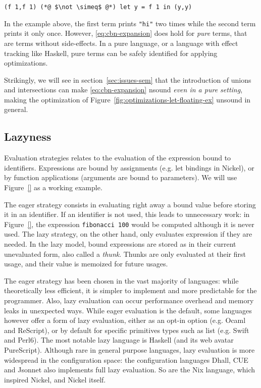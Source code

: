 \documentclass[sigplan,10pt,review,anonymous]{acmart}
\newcommand{\unsure}[2][1=]{}
\newcommand{\resolved}[2]{}
\newcommand{\nickel}[1]{\lstinline[language=nickel]{#1}}
\begin{document}
\begin{lstlisting}[language=Nickel]
(f 1,f 1) (*@ $\not \simeq$ @*) let y = f 1 in (y,y)
\end{lstlisting}

In the example above, the first term prints \nickel{"hi"} two times while the
second term prints it only once. However, \ref{eq:cbn-expansion} does hold for
\emph{pure} terms, that are terms without side-effects. In a pure language, or a
language with effect tracking like Haskell, pure terms can be safely identified for applying
optimizations.

Strikingly, we will see in section~\ref{sec:issues-sem} that the introduction of
unions and intersections can make \ref{eq:cbn-expansion} \resolved{it} unsound
\emph{even in a pure setting}, making the optimization of
Figure~\ref{fig:optimizations-let-floating-ex} unsound in general.

\unsure{Should we tease already here that unions and intersections break this
even for pure terms?}

\subsection*{Lazyness}
Evaluation strategies relates to the evaluation of the expression bound to
identifiers. Expressions are bound by assignments (e.g. let bindings in
Nickel), or by function applications (arguments are bound to parameters). We
will use Figure~\ref{} as a working example.

The eager strategy consists in evaluating right away a bound value before
storing it in an identifier. If an identifier is not used, this leads to
unnecessary work: in Figure~\ref{}, the expression \nickel{fibonacci 100} would
be computed although it is never used. The lazy strategy, on the other hand,
only evaluates expression if they are needed. In the lazy model, bound
expressions are stored as in their current unevaluated form, also called a
\emph{thunk}. Thunks are only evaluated at their first usage, and their value is
memoized for future usages.

The eager strategy has been chosen in the vast majority of languages: while
theoretically less efficient, it is simpler to implement and more predictable
for the programmer. Also, lazy evaluation can occur performance overhead and
memory leaks in unexpected ways. While eager evaluation is the default, some
languages however offer a form of lazy evaluation, either as an opt-in option
(e.g. Ocaml and ReScript), or by default for specific primitives types such as
list (e.g.  Swift and Perl6). The most notable lazy language is Haskell
(and its web avatar PureScript). Although rare in general purpose languages,
lazy evaluation is more widespread in the configuration space: the configuration
languages Dhall, CUE and Jsonnet also implements full lazy evaluation. So are
the Nix language, which inspired Nickel, and Nickel itself.
\end{document}
